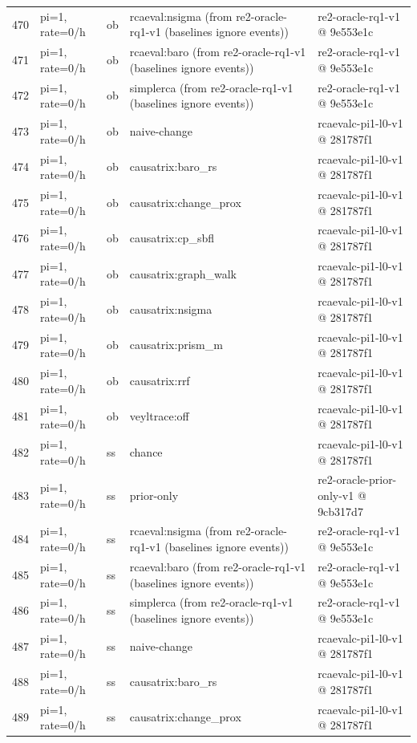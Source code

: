 \begin{longtable}{@{}r>{\raggedright\arraybackslash}p{48.0pt}>{\raggedright\arraybackslash}p{18.0pt}>{\raggedright\arraybackslash}p{108.0pt}>{\raggedright\arraybackslash}p{105.0pt}@{}}
470 & pi=1, rate=0/h & ob & rcaeval:nsigma (from re2-oracle-rq1-v1 (baselines ignore events)) & re2-oracle-rq1-v1 @ 9e553e1c \\
471 & pi=1, rate=0/h & ob & rcaeval:baro (from re2-oracle-rq1-v1 (baselines ignore events)) & re2-oracle-rq1-v1 @ 9e553e1c \\
472 & pi=1, rate=0/h & ob & simplerca (from re2-oracle-rq1-v1 (baselines ignore events)) & re2-oracle-rq1-v1 @ 9e553e1c \\
473 & pi=1, rate=0/h & ob & naive-change & rcaevalc-pi1-l0-v1 @ 281787f1 \\
474 & pi=1, rate=0/h & ob & causatrix:baro\_rs & rcaevalc-pi1-l0-v1 @ 281787f1 \\
475 & pi=1, rate=0/h & ob & causatrix:change\_prox & rcaevalc-pi1-l0-v1 @ 281787f1 \\
476 & pi=1, rate=0/h & ob & causatrix:cp\_sbfl & rcaevalc-pi1-l0-v1 @ 281787f1 \\
477 & pi=1, rate=0/h & ob & causatrix:graph\_walk & rcaevalc-pi1-l0-v1 @ 281787f1 \\
478 & pi=1, rate=0/h & ob & causatrix:nsigma & rcaevalc-pi1-l0-v1 @ 281787f1 \\
479 & pi=1, rate=0/h & ob & causatrix:prism\_m & rcaevalc-pi1-l0-v1 @ 281787f1 \\
480 & pi=1, rate=0/h & ob & causatrix:rrf & rcaevalc-pi1-l0-v1 @ 281787f1 \\
481 & pi=1, rate=0/h & ob & veyltrace:off & rcaevalc-pi1-l0-v1 @ 281787f1 \\
482 & pi=1, rate=0/h & ss & chance & rcaevalc-pi1-l0-v1 @ 281787f1 \\
483 & pi=1, rate=0/h & ss & prior-only & re2-oracle-prior-only-v1 @ 9cb317d7 \\
484 & pi=1, rate=0/h & ss & rcaeval:nsigma (from re2-oracle-rq1-v1 (baselines ignore events)) & re2-oracle-rq1-v1 @ 9e553e1c \\
485 & pi=1, rate=0/h & ss & rcaeval:baro (from re2-oracle-rq1-v1 (baselines ignore events)) & re2-oracle-rq1-v1 @ 9e553e1c \\
486 & pi=1, rate=0/h & ss & simplerca (from re2-oracle-rq1-v1 (baselines ignore events)) & re2-oracle-rq1-v1 @ 9e553e1c \\
487 & pi=1, rate=0/h & ss & naive-change & rcaevalc-pi1-l0-v1 @ 281787f1 \\
488 & pi=1, rate=0/h & ss & causatrix:baro\_rs & rcaevalc-pi1-l0-v1 @ 281787f1 \\
489 & pi=1, rate=0/h & ss & causatrix:change\_prox & rcaevalc-pi1-l0-v1 @ 281787f1 \\

\end{longtable}
